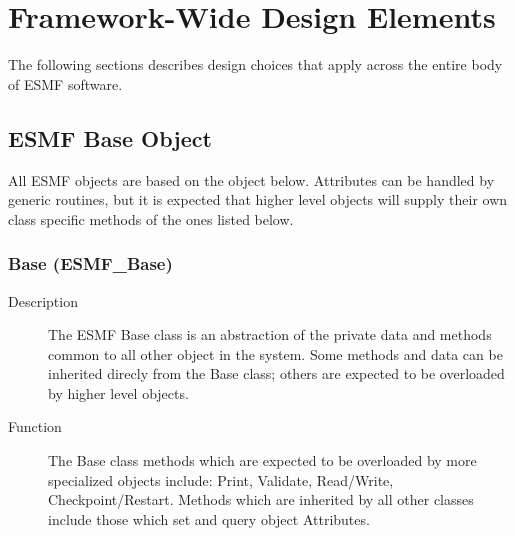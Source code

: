 \section{Framework-Wide Design Elements}
\label{sec:fwdesign}

The following sections describes design choices that apply across the 
entire body of ESMF software.

\subsection{ESMF Base Object}
\label{sec:esmfbase}

All ESMF objects are based on the object below.  Attributes
can be handled by generic routines, but it is expected that 
higher level objects will supply their own class specific
methods of the ones listed below.


\subsubsection{Base (ESMF\_Base)}
\label{sec:Base} 
\begin{description}
\item [Description] The ESMF Base class is an abstraction of the private data and
methods common to all other object in the system.  Some methods and data can be
inherited direcly from the Base class; others are expected to be overloaded by
higher level objects.
\item [Function] The Base class methods which are expected to be overloaded by
more specialized objects include: Print, Validate, Read/Write, Checkpoint/Restart.
Methods which are inherited by all other classes include those which 
set and query object Attributes.
\end{description}








